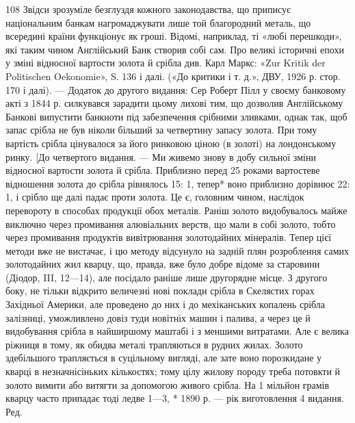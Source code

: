 108 Звідси зрозуміле безглуздя кожного законодавства, що приписує
національним банкам нагромаджувати лише той благородний металь,
що всередині країни функціонує як гроші. Відомі, наприклад, ті «любі
перешкоди», які таким чином Англійський Банк створив собі сам. Про
великі історичні епохи у зміні відносної вартости золота й срібла див.
Карл Маркс: «Zur Kritik der Politischen Oekonomie», S. 136 і далі. («До
критики і т. д.», ДВУ, 1926 р. стор. 170 і далі). — Додаток до другого видання:
Сер Роберт Пілл у своєму банковому акті з 1844 р. силкувався зарадити
цьому лихові тим, що дозволив Англійському Банкові випустити банкноти
під забезпечення срібними зливками, однак так, щоб запас срібла
не був ніколи більший за четвертину запасу золота. При тому вартість
срібла цінувалося за його ринковою ціною (в золоті) на лондонському
ринку. [До четвертого видання. — Ми живемо знову в добу сильної зміни
відносної вартости золота й срібла. Приблизно перед 25 роками вартостеве
відношення золота до срібла рівнялось 15: 1, тепер* воно приблизно
дорівнює 22: 1, і срібло ще далі падає проти золота. Це є, головним чином,
наслідок перевороту в способах продукції обох металів. Раніш золото
видобувалось майже виключно через промивання алювіальних
верств, що мали в собі золото, тобто через промивання продуктів вивітрювання
золотодайних мінералів. Тепер цієї методи вже не вистачає,
і цю методу відсунуло на задній плян розроблення самих золотодайних
жил кварцу, що, правда, вже було добре відоме за старовини (Діодор, III,
12—14), але посідало раніше лише другорядне місце. З другого боку, не
тільки відкрито величезні нові поклади срібла в Скелястих горах Західньої
Америки, але проведено до них і до мехіканських копалень срібла
залізниці, уможливлено довіз туди новітніх машин і палива, а через це
й видобування срібла в найширшому маштабі і з меншими витратами.
Але є велика ріжниця в тому, як обидва металі трапляються в рудних
жилах. Золото здебільшого трапляється в суцільному вигляді, але зате воно
порозкидане у кварці в незначнісіньких кількостях; тому цілу жилову
породу треба потовкти й золото вимити або витягти за допомогою живого
срібла. На 1 мільйон грамів кварцу часто припадає тоді ледве 1—3,
* 1890 р. — рік виготовлення 4 видання. Ред.
